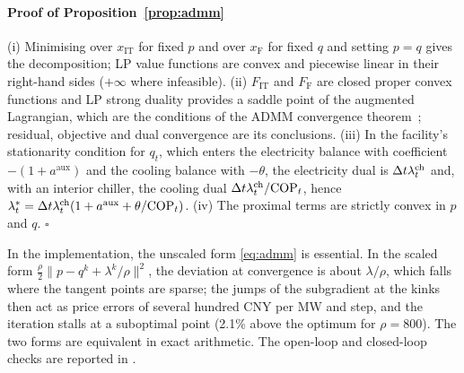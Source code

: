 \paragraph{Proof of Proposition~\ref{prop:admm}} (i) Minimising over $x_{\mathrm{IT}}$ for fixed $p$ and over $x_{\mathrm F}$
for fixed $q$ and setting $p=q$ gives the decomposition; LP value functions are convex and piecewise linear in their
right-hand sides ($+\infty$ where infeasible). (ii) $F_{\mathrm{IT}}$ and $F_{\mathrm F}$ are closed proper convex
functions and LP strong duality provides a saddle point of the augmented Lagrangian, which are the conditions of the ADMM
convergence theorem~\cite{boyd2011}; residual, objective and dual convergence are its conclusions. (iii) In the
facility's stationarity condition for $q_t$, which enters the electricity balance with coefficient $-(1+a^{\mathrm{aux}})$
and the cooling balance with $-\theta$, the electricity dual is $\Delta t\lambda^{\mathrm{ch}}_t$ and, with an interior chiller, the cooling
dual $\Delta t\lambda^{\mathrm{ch}}_t/\mathrm{COP}_t$, hence $\lambda^*_t=\Delta t\lambda^{\mathrm{ch}}_t(1+a^{\mathrm{aux}}+\theta/\mathrm{COP}_t)$. (iv) The proximal terms are
strictly convex in $p$ and $q$. $\square$

In the implementation, the unscaled form \eqref{eq:admm} is essential. In the scaled form
$\frac{\rho}{2}\|p-q^k+\lambda^k/\rho\|^2$, the deviation at convergence is about $\lambda/\rho$, which falls where
the tangent points are sparse; the jumps of the subgradient at the kinks then act as price errors of several hundred
CNY per MW and step, and the iteration stalls at a suboptimal point (2.1\% above the optimum for $\rho=800$). The two
forms are equivalent in exact arithmetic. The open-loop and closed-loop checks are reported in .
